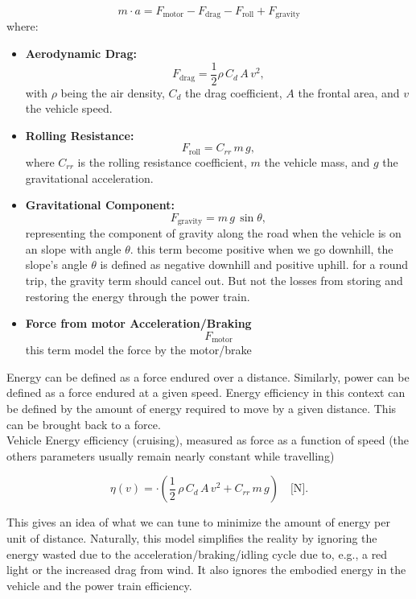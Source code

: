 \[
m\cdot a = F_{\text{motor}} - F_{\text{drag}} - F_{\text{roll}} + F_{\text{gravity}}
\]
where:
\begin{itemize}
    \item \textbf{Aerodynamic Drag:} 
    \[
    F_{\text{drag}} = \frac{1}{2} \rho\, C_d\, A\, v^2,
    \]
    with \(\rho\) being the air density, \(C_d\) the drag coefficient, \(A\) the frontal area, and \(v\) the vehicle speed.
    \item \textbf{Rolling Resistance:} 
    \[
    F_{\text{roll}} = C_{rr}\, m\, g,
    \]
    where \(C_{rr}\) is the rolling resistance coefficient, \(m\) the vehicle mass, and \(g\) the gravitational acceleration.
    \item \textbf{Gravitational Component:} 
    \[
    F_{\text{gravity}} = m\, g\, \sin\theta,
    \]
    representing the component of gravity along the road when the vehicle is on an slope with angle \(\theta\). this term become positive when we go downhill, the slope's angle $\theta$ is defined as negative downhill and positive uphill. for a round trip, the gravity term should cancel out. But not the losses from storing and restoring the energy through the power train.
    \item \textbf{Force from motor Acceleration/Braking} 
    \[
    F_{\text{motor}}
    \]
    this term model the force by the motor/brake
\end{itemize}

Energy can be defined as a force endured over a distance. Similarly, power can be defined as a force endured at a given speed. Energy efficiency in this context can be defined by the amount of energy required to move by a given distance. This can be brought back to a force.\\

Vehicle Energy efficiency (cruising), measured as force as a function of speed (the others parameters usually remain nearly constant while travelling)

\begin{equation}
\eta(v) = \cdot\left( \frac{1}{2}\,\rho\,C_d\,A\,v^2 + C_{rr}\,m\,g\right) \quad \text{[N]}.
\label{eq:energy_consumption}
\end{equation}


This gives an idea of what we can tune to minimize the amount of energy per unit of distance. Naturally, this model simplifies the reality by ignoring the energy wasted due to the acceleration/braking/idling cycle due to, e.g., a red light or the increased drag from wind. It also ignores the embodied energy in the vehicle and the power train efficiency.

